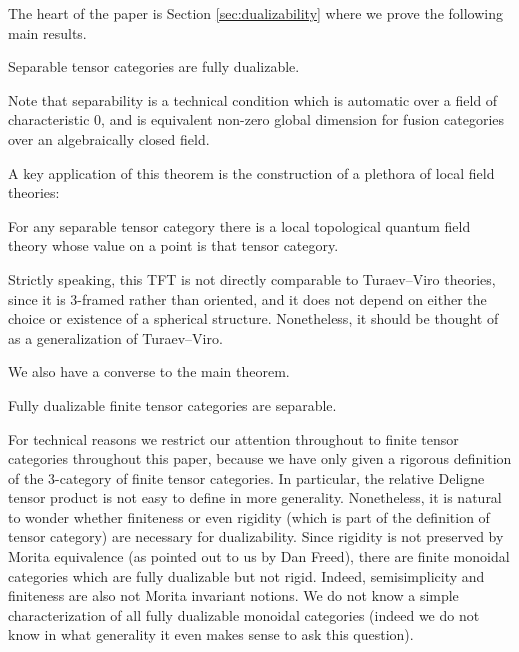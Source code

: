 \documentclass{amsart}
\begin{document}
The heart of the paper is Section \ref{sec:dualizability} where we prove the following main results.


\begin{maintheorem} \label{thm1}
Separable tensor categories are fully dualizable.
\end{maintheorem}

\nid Note that separability is a technical condition which is automatic over a field of characteristic $0$, and is equivalent non-zero global dimension for fusion categories over an algebraically closed field.

A key application of this theorem is the construction of a plethora of local field theories:
\begin{maincor} \label{cor2}
For any separable tensor category there is a local topological quantum field theory whose value on a point is that tensor category.
\end{maincor}

\nid Strictly speaking, this TFT is not directly comparable to Turaev--Viro theories, since it is $3$-framed rather than oriented, and it does not depend on either the choice or existence of a spherical structure.  Nonetheless, it should be thought of as a generalization of Turaev--Viro.

We also have a converse to the main theorem.

\begin{maintheorem} \label{thm3}
Fully dualizable finite tensor categories are separable.
\end{maintheorem}

For technical reasons we restrict our attention throughout to finite tensor categories throughout this paper, because we have only given a rigorous definition of the $3$-category of finite tensor categories.  In particular, the relative Deligne tensor product is not easy to define in more generality.  Nonetheless, it is natural to wonder whether finiteness or even rigidity (which is part of the definition of tensor category) are necessary for dualizability.  Since rigidity is not preserved by Morita equivalence (as pointed out to us by Dan Freed), there are finite monoidal categories which are fully dualizable but not rigid.  Indeed, semisimplicity and finiteness are also not Morita invariant notions.  We do not know a simple characterization of all fully dualizable monoidal categories (indeed we do not know in what generality it even makes sense to ask this question).
\end{document}
